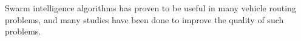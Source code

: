 Swarm intelligence algorithms has proven to be useful in many vehicle routing problems, and many studies have been done to improve the quality of such problems.





  

